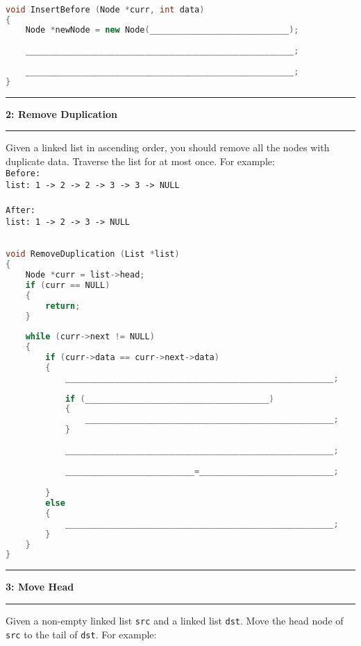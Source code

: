 \documentclass[10.5pt]{article}
\newcommand\question[2]{\vspace{.25in}\hrule\textbf{#1: #2}\vspace{.5em}\hrule\vspace{.10in}}
\begin{document}
\hrulefill
\begin{lstlisting}[language=C++]

void InsertBefore (Node *curr, int data)
{
    Node *newNode = new Node(____________________________);
    
    ______________________________________________________;
    
    ______________________________________________________;
}

\end{lstlisting}

\pagebreak

\question{2}{Remove Duplication}
Given a linked list in ascending order, you should remove all the nodes with duplicate data. Traverse the list for at most once. For example: \\

\texttt{Before:}\\
\texttt{list: 1 -> 2 -> 2 -> 3 -> 3 -> NULL}\\
\\
\texttt{After:}\\
\texttt{list: 1 -> 2 -> 3 -> NULL}\\


\hrulefill
\begin{lstlisting}[language=C++]

void RemoveDuplication (List *list)
{
    Node *curr = list->head;
    if (curr == NULL) 
    {
        return;
    }
	
    while (curr->next != NULL)
    {
        if (curr->data == curr->next->data)
        {
            ______________________________________________________;
                        
            if (_____________________________________)
            {
                __________________________________________________;
            }
            
            ______________________________________________________;
            
            __________________________=___________________________;

        }
        else
        {
            ______________________________________________________;
        }
    }
}
\end{lstlisting}
\pagebreak


\question{3}{Move Head}
Given a non-empty linked list \texttt{src} and a linked list \texttt{dst}. Move the head node of \texttt{src} to the tail of \texttt{dst}. For example: \\
\end{document}
